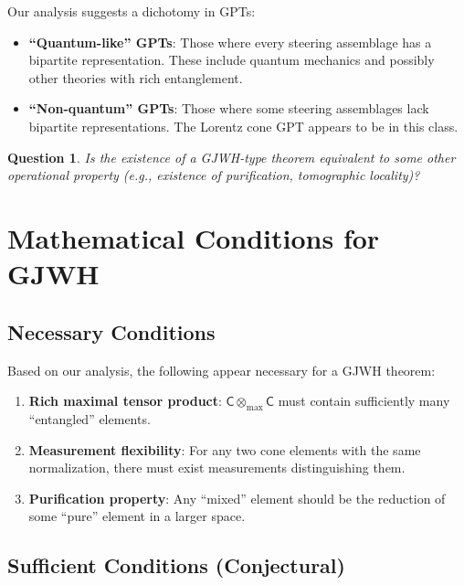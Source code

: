 \documentclass[11pt,a4paper]{article}
\newtheorem{question}[theorem]{Question}
\theoremstyle{definition}
\newcommand{\C}{\mathsf{C}}
\newcommand{\tmax}{\otimes_{\max}}
\begin{document}
Our analysis suggests a dichotomy in GPTs:

\begin{itemize}
    \item \textbf{``Quantum-like'' GPTs}: Those where every steering assemblage has a bipartite representation. These include quantum mechanics and possibly other theories with rich entanglement.

    \item \textbf{``Non-quantum'' GPTs}: Those where some steering assemblages lack bipartite representations. The Lorentz cone GPT appears to be in this class.
\end{itemize}

\begin{question}
Is the existence of a GJWH-type theorem equivalent to some other operational property (e.g., existence of purification, tomographic locality)?
\end{question}

\section{Mathematical Conditions for GJWH}

\subsection{Necessary Conditions}

Based on our analysis, the following appear necessary for a GJWH theorem:

\begin{enumerate}
    \item \textbf{Rich maximal tensor product}: $\C \tmax \C$ must contain sufficiently many ``entangled'' elements.

    \item \textbf{Measurement flexibility}: For any two cone elements with the same normalization, there must exist measurements distinguishing them.

    \item \textbf{Purification property}: Any ``mixed'' element should be the reduction of some ``pure'' element in a larger space.
\end{enumerate}

\subsection{Sufficient Conditions (Conjectural)}
\end{document}
